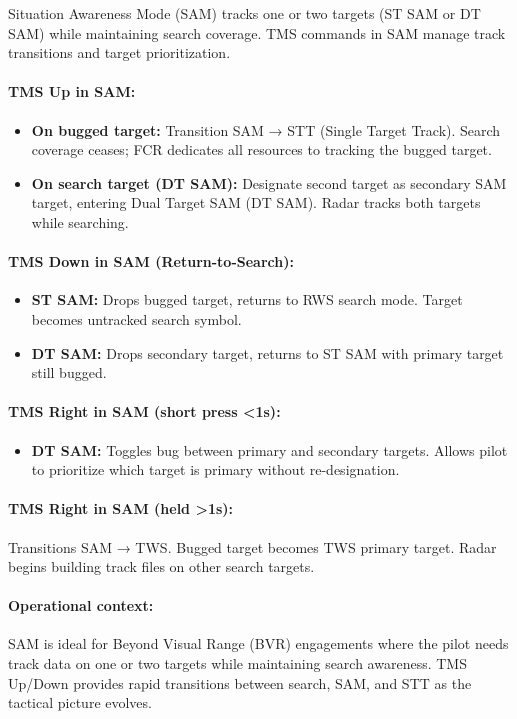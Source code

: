 \documentclass[11pt, a4paper, twoside]{report}
\begin{document}
Situation Awareness Mode (SAM) tracks one or two targets (ST SAM or DT SAM) while maintaining search coverage. TMS commands in SAM manage track transitions and target prioritization.

\paragraph{TMS Up in SAM:}
\begin{itemize}
    \item \textbf{On bugged target:} Transition SAM → STT (Single Target Track). Search coverage ceases; FCR dedicates all resources to tracking the bugged target.
    \item \textbf{On search target (DT SAM):} Designate second target as secondary SAM target, entering Dual Target SAM (DT SAM). Radar tracks both targets while searching.
\end{itemize}

\paragraph{TMS Down in SAM (Return-to-Search):}
\begin{itemize}
    \item \textbf{ST SAM:} Drops bugged target, returns to RWS search mode. Target becomes untracked search symbol.
    \item \textbf{DT SAM:} Drops secondary target, returns to ST SAM with primary target still bugged.
\end{itemize}

\paragraph{TMS Right in SAM (short press <1s):}
\begin{itemize}
    \item \textbf{DT SAM:} Toggles bug between primary and secondary targets. Allows pilot to prioritize which target is primary without re-designation.
\end{itemize}

\paragraph{TMS Right in SAM (held >1s):}
Transitions SAM → TWS. Bugged target becomes TWS primary target. Radar begins building track files on other search targets.

\paragraph{Operational context:}
SAM is ideal for Beyond Visual Range (BVR) engagements where the pilot needs track data on one or two targets while maintaining search awareness. TMS Up/Down provides rapid transitions between search, SAM, and STT as the tactical picture evolves.
\end{document}
